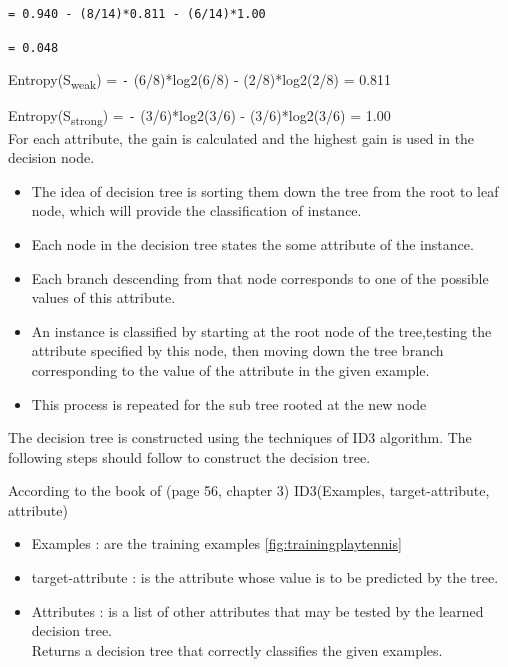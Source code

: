 \documentclass{report}
\newcommand\textstyleTeletype[1]{\texttt{#1}}
\begin{document}
\textstyleTeletype{= 0.940 {}- (8/14)*0.811 {}- (6/14)*1.00}

\textstyleTeletype{= 0.048}

Entropy(S\textsubscript{weak}) = \textstyleTeletype{{}-} (6/8)*log2(6/8)
{}- (2/8)*log2(2/8) = 0.811

Entropy(S\textsubscript{strong}) = \textstyleTeletype{{}-}
(3/6)*log2(3/6) {}- (3/6)*log2(3/6) = 1.00\\

For each attribute, the gain is calculated and the highest gain is used
in the decision node.


\begin{itemize}

\item The idea of decision tree is sorting them down the tree from the root to leaf node, which will provide the classification of instance.
\item Each node in the decision tree states the some attribute of the instance.
\item Each branch descending from that node corresponds to one of the possible values of this attribute.
\item An instance is classified by starting at the root node of the tree,testing the attribute specified by this node, then moving down the tree branch corresponding to the value of the attribute in the given example.
\item This process is repeated for the sub tree rooted at the new node

\end{itemize}

The decision tree is constructed using the techniques of ID3 algorithm. The following steps should follow to construct the decision tree.

According to the book of \cite{Mitchell1997MachineLearning} (page 56, chapter 3) ID3(Examples, target-attribute, attribute)
\begin{itemize}
\item Examples : are the training examples \ref{fig:trainingplaytennis}
\item target-attribute : is the attribute whose value is to be predicted by the tree.
\item Attributes : is a list of other attributes that may be tested by the learned decision tree.\\
Returns a decision tree that correctly classifies the given examples.\\
\end{itemize}
\end{document}
